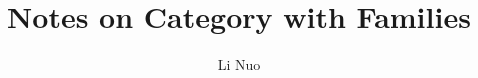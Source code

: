 \documentclass{article}
\author{Li Nuo}
\title{Notes on Category with Families}
\theoremstyle{definition}
\begin{document}
\maketitle

\tableofcontents

\newpage

\begin{abstract}
\end{abstract}








\newpage


\end{document}
